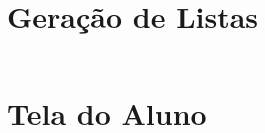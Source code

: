 \documentclass[12pt,oneside,a4paper,article]{abntex2}
\begin{document}
	\section{Geração de Listas}
		\begin{mdframed}[linecolor=black, topline=true, bottomline=true,leftline=false, rightline=false, backgroundcolor=white,userdefinedwidth=\textwidth]
			\inputminted[linenos=true,numberblanklines=true,showspaces=false,breaklines=true]{html}{Codigos/gerar.html}
		\end{mdframed}
		
		\pagebreak
			
	\section{Tela do Aluno}
		\begin{mdframed}[linecolor=black, topline=true, bottomline=true,leftline=false, rightline=false, backgroundcolor=white,userdefinedwidth=\textwidth]
			\inputminted[linenos=true,numberblanklines=true,showspaces=false,breaklines=true]{html}{Codigos/aluno.html}
		\end{mdframed}
		
\end{document}
